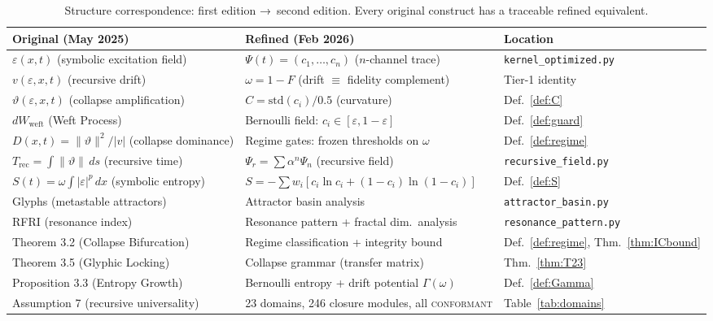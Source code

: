 \documentclass[
  aps,
  prd,
  preprint,
  superscriptaddress,
  nofootinbib,
  floatfix,
  longbibliography
]{revtex4-2}
\newcommand{\Gam}{\Gamma}
\newcommand{\eps}{\varepsilon}
\newcommand{\regime}[1]{\textrm{\upshape\scshape#1}}
\newcommand{\conform}{\regime{conformant}}
\newcommand{\Fid}{F}
\newcommand{\Drft}{\omega}
\newcommand{\Ent}{S}
\newcommand{\Curv}{C}
\newcommand{\Psifield}{\Psi}
\newcommand{\Psirec}{\Psi_{r}}
\begin{document}
\begin{table}[t]
\centering
\small
\caption{Structure correspondence: first edition →\ second edition.
  Every original construct has a traceable refined equivalent.}
\label{tab:correspondence}
\begin{tabular}{@{}p{5.6cm}p{5.6cm}l@{}}
\toprule
\textbf{Original (May 2025)} &
\textbf{Refined (Feb 2026)} &
\textbf{Location} \\
\midrule
$\varepsilon(x,t)$ (symbolic excitation field) &
$\Psifield(t) = (c_1, \ldots, c_n)$ ($n$-channel trace) &
\texttt{kernel\_optimized.py} \\
$v(\varepsilon,x,t)$ (recursive drift) &
$\Drft = 1 - \Fid$ (drift $\equiv$ fidelity complement) &
Tier-1 identity \\
$\vartheta(\varepsilon,x,t)$ (collapse amplification) &
$\Curv = \mathrm{std}(c_i)/0.5$ (curvature) &
Def.~\ref{def:C} \\
$dW_{\mathrm{weft}}$ (Weft Process) &
Bernoulli field: $c_i \in [\eps, 1-\eps]$ &
Def.~\ref{def:guard} \\
$D(x,t) = \|\vartheta\|^2/|v|$ (collapse dominance) &
Regime gates: frozen thresholds on $\Drft$ &
Def.~\ref{def:regime} \\
$T_{\mathrm{rec}} = \int \|\vartheta\|\,ds$ (recursive time) &
$\Psirec = \sum \alpha^n \Psifield_n$ (recursive field) &
\texttt{recursive\_field.py} \\
$S(t) = \omega\int|\varepsilon|^p\,dx$ (symbolic entropy) &
$\Ent = -\sum w_i[c_i\ln c_i + (1-c_i)\ln(1-c_i)]$ &
Def.~\ref{def:S} \\
Glyphs (metastable attractors) &
Attractor basin analysis &
\texttt{attractor\_basin.py} \\
RFRI (resonance index) &
Resonance pattern + fractal dim.\ analysis &
\texttt{resonance\_pattern.py} \\
Theorem 3.2 (Collapse Bifurcation) &
Regime classification + integrity bound &
Def.~\ref{def:regime}, Thm.~\ref{thm:ICbound} \\
Theorem 3.5 (Glyphic Locking) &
Collapse grammar (transfer matrix) &
Thm.~\ref{thm:T23} \\
Proposition 3.3 (Entropy Growth) &
Bernoulli entropy + drift potential $\Gam(\Drft)$ &
Def.~\ref{def:Gamma} \\
Assumption 7 (recursive universality) &
23 domains, 246 closure modules, all \conform{} &
Table~\ref{tab:domains} \\
\bottomrule
\end{tabular}
\end{table}
\end{document}
